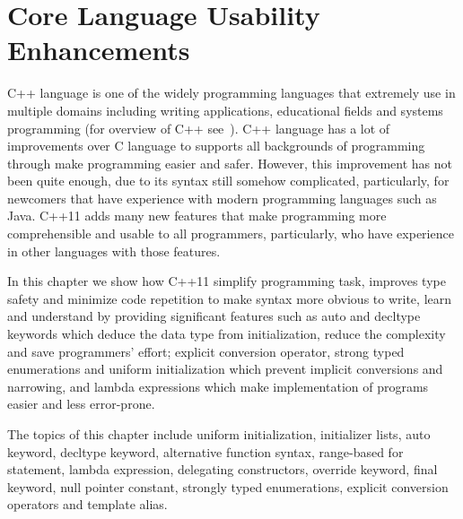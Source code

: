 \documentclass[11pt]{report}
\begin{document}
\chapter{Core Language Usability Enhancements}
\label{chapter: Usability Enhancements}
C++ language is one of the widely programming languages that extremely use in multiple domains including writing applications, educational fields and systems programming (for overview of C++ see~\cite{Cppreference:2012:Cpp11}). C++ language has a lot of improvements over C language to supports all backgrounds of programming through make programming easier and safer. However, this improvement has not been quite enough, due to its syntax still somehow complicated, particularly, for newcomers that have experience with modern programming languages such as Java. C++11 adds many new features that make programming more comprehensible and usable to all programmers, particularly, who have experience in other languages with those features.

In this chapter we show how C++11 simplify programming task, improves type safety and minimize code repetition to make syntax more obvious to write, learn and understand by providing significant features such as auto and decltype keywords which deduce the data type from initialization, reduce the complexity and save programmers' effort; explicit conversion operator, strong typed enumerations and uniform initialization which prevent implicit conversions and narrowing, and lambda expressions which make implementation of programs easier and less error-prone.

The topics of this chapter include uniform initialization, initializer lists, auto keyword, decltype keyword, alternative function syntax, range-based for statement, lambda expression, delegating constructors, override keyword, final keyword, null pointer constant, strongly typed enumerations, explicit conversion operators and template alias.
\end{document}
